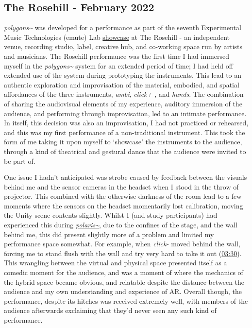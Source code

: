 \subsection{The Rosehill - February 2022}\label{sec: polygons-performances-rosehill}
\textit{polygons\textasciitilde{}} was developed for a performance as part of the seventh Experimental Music Technologies (emute) Lab \href{http://www.emutelab.org/blog/emutelab6}{showcase} at The Rosehill - an independent venue, recording studio, label, creative hub, and co-working space run by artists and musicians. The Rosehill performance was the first time I had immersed myself in the \textit{polygons\textasciitilde{}} system for an extended period of time; I had held off extended use of the system during prototyping the instruments. This lead to an authentic exploration and improvisation of the material, embodied, and spatial affordances of the three instruments, \textit{ambi}, \textit{click+-}, and \textit{hands}. The combination of sharing the audiovisual elements of my experience, auditory immersion of the audience, and performing through improvisation, led to an intimate performance. In itself, this decision was also an improvisation, I had not practiced or rehearsed, and this was my first performance of a non-traditional instrument. This took the form of me taking it upon myself to `showcase' the instruments to the audience, through a kind of theatrical and gestural dance that the audience were invited to be part of. 

One issue I hadn't anticipated was strobe caused by feedback between the visuals behind me and the sensor cameras in the headset when I stood in the throw of projector. This combined with the otherwise darkness of the room lead to a few moments where the sensors on the headset momentarily lost calibration, moving the Unity scene contents slightly. Whilst I (and study participants) had experienced this during \hyperref[sec: polaris-feedback-adoption-alignment]{\textit{polaris\textasciitilde{}}}, due to the confines of the stage, and the wall behind me, this did present slightly more of a problem and limited my performance space somewhat. For example, when \textit{click-} moved behind the wall, forcing me to stand flush with the wall and try very hard to take it out (\href{https://youtu.be/9IErsDvhXjM?t=210}{03:30}). This wrangling between the virtual and physical space presented itself as a comedic moment for the audience, and was a moment of where the mechanics of the hybrid space became obvious, and relatable despite the distance between the audience and my own understanding and experience of AR. Overall though, the performance, despite its hitches was received extremely well, with members of the audience afterwards exclaiming that they'd never seen any such kind of performance. 

